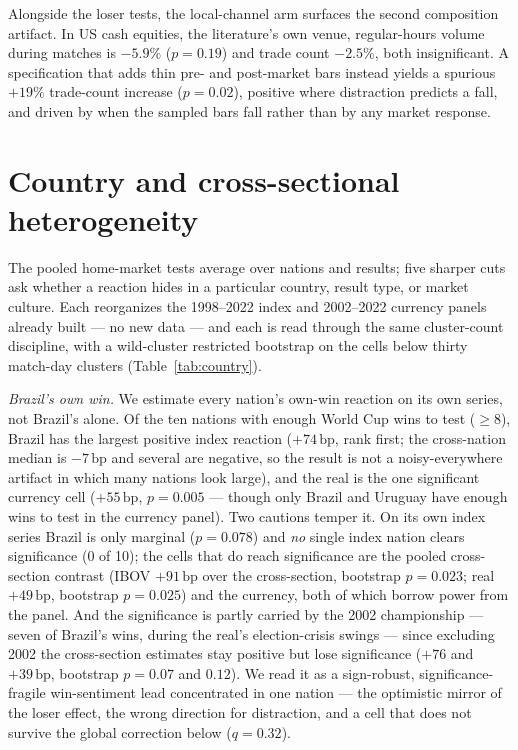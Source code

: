 \documentclass[12pt]{article}
\newcommand{\bp}{\,\text{bp}}
\begin{document}
Alongside the loser tests, the local-channel arm surfaces the second composition artifact. In US cash equities, the literature's own venue, regular-hours volume during matches is $-5.9\%$ ($p=0.19$) and trade count $-2.5\%$, both insignificant. A specification that adds thin pre- and post-market bars instead yields a spurious $+19\%$ trade-count increase ($p=0.02$), positive where distraction predicts a fall, and driven by when the sampled bars fall rather than by any market response.

\section{Country and cross-sectional heterogeneity}\label{sec:country}
The pooled home-market tests average over nations and results; five sharper cuts ask whether a reaction hides in a particular country, result type, or market culture. Each reorganizes the 1998--2022 index and 2002--2022 currency panels already built --- no new data --- and each is read through the same cluster-count discipline, with a wild-cluster restricted bootstrap on the cells below thirty match-day clusters (Table~\ref{tab:country}).

\emph{Brazil's own win.} We estimate every nation's own-win reaction on its own series, not Brazil's alone. Of the ten nations with enough World Cup wins to test ($\geq 8$), Brazil has the largest positive index reaction ($+74\bp$, rank first; the cross-nation median is $-7\bp$ and several are negative, so the result is not a noisy-everywhere artifact in which many nations look large), and the real is the one significant currency cell ($+55\bp$, $p=0.005$ --- though only Brazil and Uruguay have enough wins to test in the currency panel). Two cautions temper it. On its own index series Brazil is only marginal ($p=0.078$) and \emph{no} single index nation clears significance (0 of 10); the cells that do reach significance are the pooled cross-section contrast (IBOV $+91\bp$ over the cross-section, bootstrap $p=0.023$; real $+49\bp$, bootstrap $p=0.025$) and the currency, both of which borrow power from the panel. And the significance is partly carried by the 2002 championship --- seven of Brazil's wins, during the real's election-crisis swings --- since excluding 2002 the cross-section estimates stay positive but lose significance ($+76$ and $+39\bp$, bootstrap $p=0.07$ and $0.12$). We read it as a sign-robust, significance-fragile win-sentiment lead concentrated in one nation --- the optimistic mirror of the loser effect, the wrong direction for distraction, and a cell that does not survive the global correction below ($q=0.32$).
\end{document}
